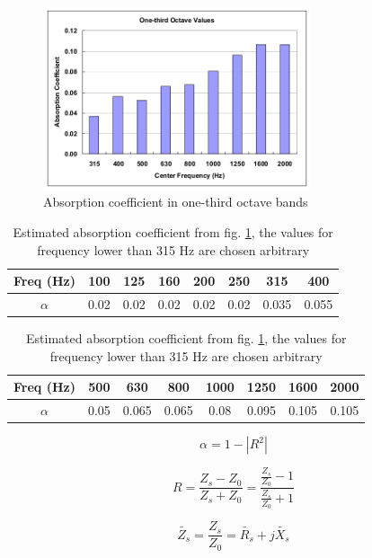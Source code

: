 \begin{figure}[H]
	\centering
	\includegraphics[width=0.7\textwidth]{fig/chap4/impedance/absorption_spectrum.png}
	\caption{Absorption coefficient in one-third octave bands \cite{Seybert2008MeasurementOP}}
	\label{fig:ground_absorption}
\end{figure}

\begin{table}[H]
	\caption{Estimated absorption coefficient from fig. \ref{fig:ground_absorption}, the values for frequency lower than 315 Hz are chosen arbitrary}
	\begin{tabular}{c|ccccccc}
		Freq (Hz)           & 100  & 125  & 160  & 200  & 250  & 315  & 400 \\ \hline
		$\alpha$ & 0.02 & 0.02 & 0.02 & 0.02 & 0.02 & 0.035 & 0.055
	\end{tabular}
	\newline
	\vspace*{10pt}
	\newline
	\begin{tabular}{c|ccccccc}
		Freq (Hz)  &  500  & 630  & 800  & 1000 & 1250 & 1600 & 2000 \\ \hline
		$\alpha$ & 0.05 & 0.065 & 0.065 & 0.08 & 0.095 & 0.105 & 0.105
	\end{tabular}
\end{table}

\begin{equation}
	\alpha = 1 - |R^2|
\end{equation}

\begin{equation}
	R = \frac{Z_s - Z_0}{Z_s + Z_0} = \frac{\frac{Z_s}{Z_0} - 1}{\frac{Z_s}{Z_0} + 1}
\end{equation}

\begin{equation}
	\tilde{Z_s} = \frac{Z_s}{Z_0} = \tilde{R_s} + j\tilde{X_s}
\end{equation}



